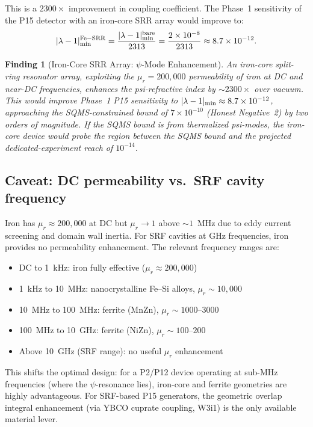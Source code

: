 \documentclass[11pt]{article}
\newtheorem{finding}{Finding}
\newcommand{\ee}[1]{\times 10^{#1}}
\begin{document}
This is a $2300\times$ improvement in coupling coefficient. The Phase~1
sensitivity of the P15 detector with an iron-core SRR array would improve to:
\begin{equation}
|\lambda-1|_{\rm min}^{\rm Fe-SRR}
= \frac{|\lambda-1|_{\rm min}^{\rm bare}}{2313}
= \frac{2\ee{-8}}{2313} \approx 8.7\ee{-12}.
\label{eq:sensitivity-Fe}
\end{equation}

\begin{finding}[Iron-Core SRR Array: $\psi$-Mode Enhancement]
An iron-core split-ring resonator array, exploiting the $\mu_r = 200{,}000$
permeability of iron at DC and near-DC frequencies, enhances the
psi-refractive index by $\sim 2300\times$ over vacuum. This would
improve Phase~1 P15 sensitivity to $|\lambda-1|_{\rm min} \approx 8.7\ee{-12}$,
approaching the SQMS-constrained bound of $7\ee{-10}$ (Honest Negative~2)
by two orders of magnitude. If the SQMS bound is from thermalized psi-modes,
the iron-core device would probe the region between the SQMS bound and the
projected dedicated-experiment reach of $10^{-14}$.
\end{finding}

\subsection{Caveat: DC permeability vs.\ SRF cavity frequency}

Iron has $\mu_r \approx 200{,}000$ at DC but $\mu_r \to 1$ above $\sim 1$~MHz
due to eddy current screening and domain wall inertia. For SRF cavities
at GHz frequencies, iron provides no permeability enhancement. The
relevant frequency ranges are:
\begin{itemize}
\item DC to 1~kHz: iron fully effective ($\mu_r \approx 200{,}000$)
\item 1~kHz to 10~MHz: nanocrystalline Fe--Si alloys, $\mu_r \sim 10{,}000$
\item 10~MHz to 100~MHz: ferrite (MnZn), $\mu_r \sim 1000$--$3000$
\item 100~MHz to 10~GHz: ferrite (NiZn), $\mu_r \sim 100$--$200$
\item Above 10~GHz (SRF range): no useful $\mu_r$ enhancement
\end{itemize}

This shifts the optimal design: for a P2/P12 device operating at
sub-MHz frequencies (where the $\psi$-resonance lies), iron-core and
ferrite geometries are highly advantageous. For SRF-based P15 generators,
the geometric overlap integral enhancement (via YBCO cuprate coupling, W3i1)
is the only available material lever.
\end{document}
